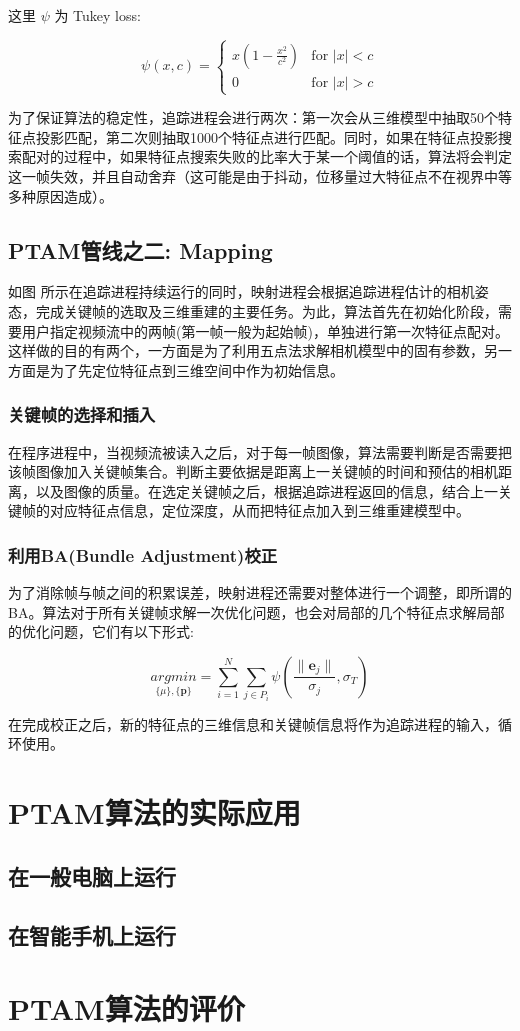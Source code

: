 这里 $\psi$ 为 Tukey loss:

\begin{equation}
\psi(x,c)= 
\begin{cases}
x(1-\frac{x^2}{c^2}) & \text{for }|x|<c \\
0  &  \text{for }|x|>c
\end{cases}
\end{equation}

为了保证算法的稳定性，追踪进程会进行两次：第一次会从三维模型中抽取50个特征点投影匹配，第二次则抽取1000个特征点进行匹配。同时，如果在特征点投影搜索配对的过程中，如果特征点搜索失败的比率大于某一个阈值的话，算法将会判定这一帧失效，并且自动舍弃（这可能是由于抖动，位移量过大特征点不在视界中等多种原因造成）。


\subsection{PTAM管线之二: Mapping}

如图 %
所示在追踪进程持续运行的同时，映射进程会根据追踪进程估计的相机姿态，完成关键帧的选取及三维重建的主要任务。为此，算法首先在初始化阶段，需要用户指定视频流中的两帧(第一帧一般为起始帧)，单独进行第一次特征点配对。这样做的目的有两个，一方面是为了利用五点法求解相机模型中的固有参数，另一方面是为了先定位特征点到三维空间中作为初始信息。

\subsubsection{关键帧的选择和插入}
在程序进程中，当视频流被读入之后，对于每一帧图像，算法需要判断是否需要把该帧图像加入关键帧集合。判断主要依据是距离上一关键帧的时间和预估的相机距离，以及图像的质量。在选定关键帧之后，根据追踪进程返回的信息，结合上一关键帧的对应特征点信息，定位深度，从而把特征点加入到三维重建模型中。

\subsubsection{利用BA(Bundle Adjustment)校正}
为了消除帧与帧之间的积累误差，映射进程还需要对整体进行一个调整，即所谓的BA。算法对于所有关键帧求解一次优化问题，也会对局部的几个特征点求解局部的优化问题，它们有以下形式:

\begin{equation}
\underset{\{\mu\},\{\mathbf{p}\}}{argmin} = \sum_{i=1}^{N} \sum_{j\in P_i} \psi(\frac{\lVert\mathbf{e}_j\rVert}{\sigma_j},\sigma_T)
\end{equation}

在完成校正之后，新的特征点的三维信息和关键帧信息将作为追踪进程的输入，循环使用。



\section{PTAM算法的实际应用}
\subsection{在一般电脑上运行}

\subsection{在智能手机上运行}

\section{PTAM算法的评价}
